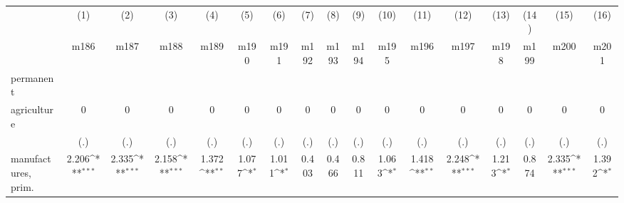 {
\def\sym#1{\ifmmode^{#1}\else\(^{#1}\)\fi}
\begin{tabular}{l*{16}{c}}
\hline\hline
                    &\multicolumn{1}{c}{(1)}&\multicolumn{1}{c}{(2)}&\multicolumn{1}{c}{(3)}&\multicolumn{1}{c}{(4)}&\multicolumn{1}{c}{(5)}&\multicolumn{1}{c}{(6)}&\multicolumn{1}{c}{(7)}&\multicolumn{1}{c}{(8)}&\multicolumn{1}{c}{(9)}&\multicolumn{1}{c}{(10)}&\multicolumn{1}{c}{(11)}&\multicolumn{1}{c}{(12)}&\multicolumn{1}{c}{(13)}&\multicolumn{1}{c}{(14)}&\multicolumn{1}{c}{(15)}&\multicolumn{1}{c}{(16)}\\
                    &\multicolumn{1}{c}{m186}&\multicolumn{1}{c}{m187}&\multicolumn{1}{c}{m188}&\multicolumn{1}{c}{m189}&\multicolumn{1}{c}{m190}&\multicolumn{1}{c}{m191}&\multicolumn{1}{c}{m192}&\multicolumn{1}{c}{m193}&\multicolumn{1}{c}{m194}&\multicolumn{1}{c}{m195}&\multicolumn{1}{c}{m196}&\multicolumn{1}{c}{m197}&\multicolumn{1}{c}{m198}&\multicolumn{1}{c}{m199}&\multicolumn{1}{c}{m200}&\multicolumn{1}{c}{m201}\\
\hline
permanent           &                     &                     &                     &                     &                     &                     &                     &                     &                     &                     &                     &                     &                     &                     &                     &                     \\
agriculture         &           0         &           0         &           0         &           0         &           0         &           0         &           0         &           0         &           0         &           0         &           0         &           0         &           0         &           0         &           0         &           0         \\
                    &         (.)         &         (.)         &         (.)         &         (.)         &         (.)         &         (.)         &         (.)         &         (.)         &         (.)         &         (.)         &         (.)         &         (.)         &         (.)         &         (.)         &         (.)         &         (.)         \\
[1em]
manufactures, prim. &       2.206\sym{***}&       2.335\sym{***}&       2.158\sym{***}&       1.372\sym{**} &       1.077\sym{*}  &       1.011\sym{*}  &       0.403         &       0.466         &       0.811         &       1.063\sym{*}  &       1.418\sym{**} &       2.248\sym{***}&       1.213\sym{*}  &       0.874         &       2.335\sym{***}&       1.392\sym{*}  \\

\end{tabular}}
